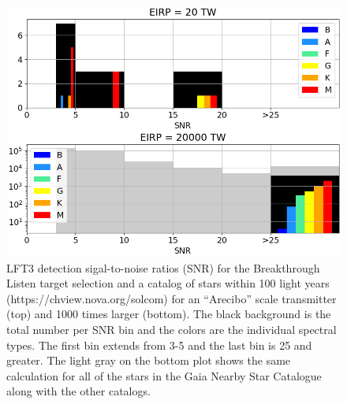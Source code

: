 \begin{figure}
    \centering
    \includegraphics[width=0.75\linewidth]{figures/catcounts.png}
    \caption{LFT3 detection sigal-to-noise ratios (SNR) for the Breakthrough Listen target selection \citep{2017PASP..129e4501I} and a catalog of stars within 100 light years (https://chview.nova.org/solcom) for an ``Arecibo'' scale transmitter (top) and 1000 times larger (bottom).  The black background is the total number per SNR bin and the colors are the individual spectral types.  The first bin extends from 3-5 and the last bin is 25 and greater.  The light gray on the bottom plot shows the same calculation for all of the stars in the Gaia Nearby Star Catalogue \citep{2021A&A...649A...6G} along with the other catalogs.}
    \label{fig:isaacsonetal}
\end{figure}



